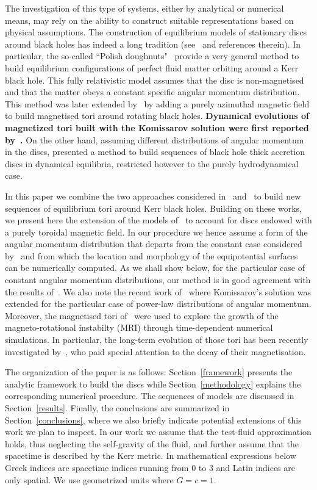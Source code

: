\documentclass[]{aa}
\begin{document}
The investigation of this type of systems, either by analytical or numerical means, may rely on the ability to construct suitable 
representations based on physical assumptions. The construction of equilibrium models of stationary discs around black holes has indeed a long tradition (see~\cite{Abramowicz:2013} and references therein). In particular, the so-called ``Polish doughnuts"~\citep{Abramowicz:1978,Kozlowski:1978} provide a  very general method to build equilibrium configurations of perfect fluid matter orbiting around a Kerr black hole. This fully relativistic model assumes that the disc is non-magnetised and that the matter obeys a  constant specific angular momentum distribution. This method was later extended by~\cite{Komissarov:2006}  by adding a purely azimuthal magnetic field to build magnetised tori around rotating black holes. {\bf Dynamical evolutions of magnetized tori built with the Komissarov solution were first reported by~\cite{Montero:2007}.}
On the other hand, assuming different distributions of angular momentum in the discs, \citet{Qian:2009} presented a method to build sequences of black hole thick accretion discs in dynamical equilibria, restricted however to the purely hydrodynamical case. 
 
 In this paper we combine the two approaches considered in~\cite{Komissarov:2006} and~\citet{Qian:2009} to build new sequences of equilibrium tori around Kerr black holes. Building on these works, we present here the extension of the models of~\citet{Qian:2009} to account for discs endowed with a purely toroidal magnetic field. In our procedure we hence assume a form of the angular momentum distribution that departs from the constant case considered by~\cite{Komissarov:2006} and from which the location and morphology of the equipotential surfaces can be numerically computed. As we shall show below, for the particular case of constant angular momentum distributions, our method is in good agreement with the results of~\citet{Komissarov:2006}. We also note the recent work of~\citet{Wielgus:2015} where Komissarov's solution was extended for the particular case of power-law distributions of angular momentum. Moreover, the magnetised tori of~\citet{Wielgus:2015} were used to explore the growth of the magneto-rotational instabilty (MRI) through time-dependent numerical simulations. In particular, the long-term evolution of those tori has been recently investigated by~\citet{Fragile:2017}, who paid special attention to the decay of their magnetisation. 

The organization of the paper is as follows: Section~\ref{framework} presents the analytic framework to build the discs while Section~\ref{methodology} explains the corresponding numerical procedure. The sequences of models are discussed in Section~\ref{results}. Finally, the conclusions are summarized in Section~\ref{conclusions}, where we also briefly indicate potential extensions of this work we plan to inspect. In our work we assume that the test-fluid approximation holds, thus neglecting the self-gravity of the fluid, and further assume that the spacetime is described by the Kerr metric. In mathematical expressions below Greek indices are spacetime indices running from 0 to 3 and Latin indices are only spatial. We use geometrized units where $G = c = 1$.
\end{document}
